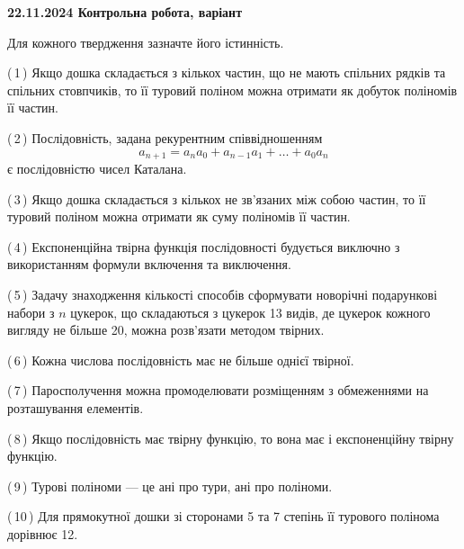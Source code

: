 \documentclass[12pt, ukrainian]{article}
\begin{document}
\begin {large}
\begin {large}
\begin {large}
\begin {large}
\begin {large}
\begin {large}
\begin {large}
\begin {large}
\begin {large}
\begin {large}
\begin {large}
\begin {large}
\begin {large}
\begin {large}
\begin {large}
{\vspace{5mm}
}
\newpage

\begin {large}

\textbf{22.11.2024 Контрольна робота, варіант  }\par


{
Для кожного твердження зазначте його істинність.\par

\vspace{2mm}

(\,1\,) Якщо дошка складається з кількох частин, що не мають спільних рядків та спільних стовпчиків, то її туровий поліном можна отримати як добуток поліномів її частин.%



(\,2\,) Послідовність, задана рекурентним співвідношенням $$a_{n+1}=a_{n}a_{0}+a_{n-1}a_{1}+\ldots+a_0a_{n}$$ є послідовністю чисел Каталана.%



(\,3\,) Якщо дошка складається з кількох не зв’язаних між собою частин, то її туровий поліном можна отримати як суму поліномів її частин.%



(\,4\,) Експоненційна твірна функція послідовності будується виключно з використанням формули включення та виключення.%



(\,5\,) Задачу знаходження кількості способів сформувати новорічні подарункові набори з $n$ цукерок, що складаються з цукерок 13 видів, де цукерок кожного вигляду не більше 20, можна розв’язати методом твірних.%



(\,6\,) Кожна числова послідовність має не більше однієї твірної.%



(\,7\,) Паросполучення можна промоделювати розміщенням з обмеженнями на розташування елементів.%



(\,8\,) Якщо послідовність має твірну функцію, то вона має і експоненційну твірну функцію.%



(\,9\,) Турові поліноми --- це ані про тури, ані про поліноми.%



(\,10\,) Для прямокутної дошки зі сторонами 5 та 7 степінь її турового полінома дорівнює 12.%




}
\end{large}
\end{large}
\end{large}
\end{large}
\end{large}
\end{large}
\end{large}
\end{large}
\end{large}
\end{large}
\end{large}
\end{large}
\end{large}
\end{large}
\end{large}
\end{large}
\end{document}
